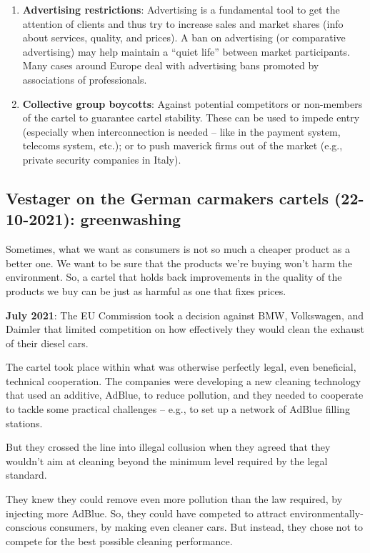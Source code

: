 \begin{enumerate}
        \item \textbf{Advertising restrictions}: Advertising is a fundamental tool to get the attention of clients and thus try to increase sales and market shares (info about services, quality, and prices). A ban on advertising (or comparative advertising) may help maintain a “quiet life” between market participants. Many cases around Europe deal with advertising bans promoted by associations of professionals.
    
        \item \textbf{Collective group boycotts}: Against potential competitors or non-members of the cartel to guarantee cartel stability. These can be used to impede entry (especially when interconnection is needed – like in the payment system, telecoms system, etc.); or to push maverick firms out of the market (e.g., private security companies in Italy).
    \end{enumerate}

    \subsection{Vestager on the German carmakers cartels (22-10-2021): greenwashing}

        Sometimes, what we want as consumers is not so much a cheaper product as a better one. We want to be sure that the products we’re buying won’t harm the environment. So, a cartel that holds back improvements in the quality of the products we buy can be just as harmful as one that fixes prices.

        \textbf{July 2021}: The EU Commission took a decision against BMW, Volkswagen, and Daimler that limited competition on how effectively they would clean the exhaust of their diesel cars.
        
        The cartel took place within what was otherwise perfectly legal, even beneficial, technical cooperation. The companies were developing a new cleaning technology that used an additive, AdBlue, to reduce pollution, and they needed to cooperate to tackle some practical challenges – e.g., to set up a network of AdBlue filling stations.
        
        But they crossed the line into illegal collusion when they agreed that they wouldn’t aim at cleaning beyond the minimum level required by the legal standard.
        
        They knew they could remove even more pollution than the law required, by injecting more AdBlue. So, they could have competed to attract environmentally-conscious consumers, by making even cleaner cars. But instead, they chose not to compete for the best possible cleaning performance.
        

